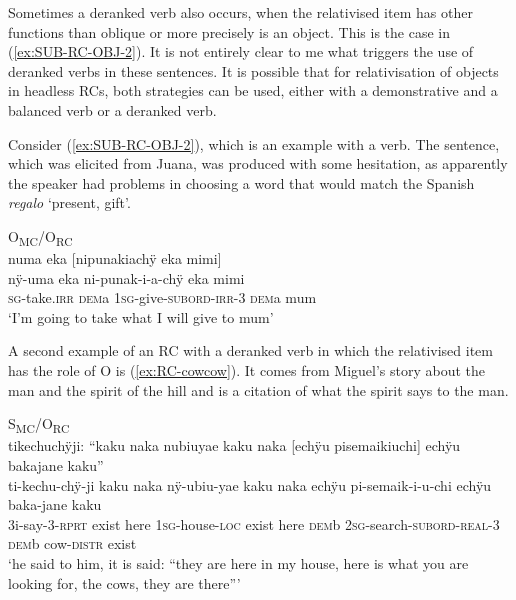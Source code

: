 Sometimes a deranked verb also occurs, when the relativised item has other functions than oblique or more precisely is an object. This is the case in (\ref{ex:SUB-RC-OBJ-2}). It is not entirely clear to me what triggers the use of deranked verbs in these sentences. It is possible that for relativisation of objects in headless RCs, both strategies can be used, either with a demonstrative and a balanced verb or a deranked verb. 

Consider (\ref{ex:SUB-RC-OBJ-2}), which is an example with a  verb. The sentence, which was elicited from Juana, was produced with some hesitation, as apparently the speaker had problems in choosing a word that would match the Spanish \textit{regalo} ‘present, gift’.



\ea\label{ex:SUB-RC-OBJ-2}
\begingl
\glpreamble \textup{O\textsubscript{MC}/O\textsubscript{RC}}\\numa eka \textup{[}nipunakiachÿ eka mimi\textup{]}\\
\gla nÿ-uma eka ni-punak-i-a-chÿ eka mimi\\
\textsc{sg}-take.\textsc{irr} \textsc{dem}a 1\textsc{sg}-give-\textsc{subord}-\textsc{irr}-3 \textsc{dem}a mum\\
\glft ‘I’m going to take what I will give to mum’
\endgl
\trailingcitation{[jxx-e191021ls-2]}
\xe

A second example of an RC with a deranked verb in which the relativised item has the role of O is (\ref{ex:RC-cowcow}). It comes from Miguel’s story about the man and the spirit of the hill and is a citation of what the spirit says to the man.

\ea\label{ex:RC-cowcow}
\begingl 
\glpreamble  \textup{S\textsubscript{MC}/O\textsubscript{RC}}\\tikechuchÿji: “kaku naka nubiuyae kaku naka \textup{[}echÿu pisemaikiuchi\textup{]} echÿu bakajane kaku”\\
\gla ti-kechu-chÿ-ji kaku naka nÿ-ubiu-yae kaku naka echÿu pi-semaik-i-u-chi echÿu baka-jane kaku\\ 
\glb 3i-say-3-\textsc{rprt} exist here 1\textsc{sg}-house-\textsc{loc} exist here \textsc{dem}b 2\textsc{sg}-search-\textsc{subord}-\textsc{real}-3 \textsc{dem}b cow-\textsc{distr} exist\\ 
\glft ‘he said to him, it is said: “they are here in my house, here is what you are looking for, the cows, they are there”’\\ 
\endgl
\xe

